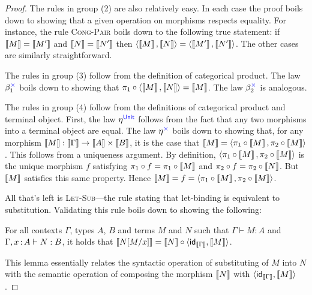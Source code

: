 \begin{proof}
  The rules in group (2) are also relatively easy.
  In each case the proof boils down to showing that
  a given operation on morphisms respects equality.
  For instance, the rule \textsc{Cong-Pair}
  boils down to the following true statement:
  if \(\left\llbracket M\right\rrbracket = \left\llbracket M'\right\rrbracket\)
  and \(\left\llbracket N\right\rrbracket = \left\llbracket N'\right\rrbracket\)
  then \(\langle \left\llbracket M\right\rrbracket,\left\llbracket N\right\rrbracket\rangle = \langle \left\llbracket M'\right\rrbracket,\left\llbracket N'\right\rrbracket\rangle\).
  The other cases are similarly straightforward.

  The rules in group (3) follow from the definition of categorical product.
  The law \(\beta^{\mathbin{{\color{blue}\times}}}_1\) boils down to showing that
  \(\pi_1 \circ \langle \left\llbracket M\right\rrbracket,\left\llbracket N\right\rrbracket\rangle = \left\llbracket M\right\rrbracket\).
  The law \(\beta^{\mathbin{{\color{blue}\times}}}_2\) is analogous.

  The rules in group (4) follow from the definitions of categorical product
  and terminal object. First, the law \(\eta^{\mathsf{{\color{blue}Unit}}}\)
  follows from the fact that any two morphisms into a terminal object are equal.
  The law \(\eta^{\mathbin{{\color{blue}\times}}}\) boils down to showing
  that, for any morphism \(\left\llbracket M\right\rrbracket : \left\llbracket \Gamma\right\rrbracket \to \left\llbracket A\right\rrbracket \times \left\llbracket B\right\rrbracket\),
  it is the case that \(\left\llbracket M\right\rrbracket = \langle \pi_1\circ \left\llbracket M\right\rrbracket, \pi_2\circ\left\llbracket M\right\rrbracket\rangle\).
  This follows from a uniqueness argument.
  By definition, \(\langle \pi_1\circ \left\llbracket M\right\rrbracket, \pi_2\circ\left\llbracket M\right\rrbracket\rangle\)
  is the unique morphism \(f\) satisfying \(\pi_1\circ f = \pi_1 \circ \left\llbracket M\right\rrbracket\)
  and \(\pi_2\circ f = \pi_2 \circ \left\llbracket N\right\rrbracket\). But \(\left\llbracket M\right\rrbracket\)
  satisfies this same property. Hence \(\left\llbracket M\right\rrbracket = f = \langle \pi_1\circ\left\llbracket M\right\rrbracket, \pi_2\circ\left\llbracket M\right\rrbracket\rangle\).

  All that's left is \textsc{Let-Sub}---the rule stating that let-binding is equivalent to substitution.
  Validating this rule boils down to showing the following:
  \begin{lemma} \label{lem:let-is-subst}
    For all contexts \(\Gamma\), types \(A\), \(B\)
    and terms \(M\) and \(N\)
    such that \(\Gamma \vdash M : A\)
    and \(\Gamma,x\,{:}\, A \vdash N : B\),
    it holds that
    \(\left\llbracket N[M/x]\right\rrbracket = \left\llbracket N\right\rrbracket \circ \langle \mathsf{id}_{\left\llbracket \Gamma\right\rrbracket},\left\llbracket M\right\rrbracket\rangle\).
  \end{lemma}
  This lemma essentially relates
  the syntactic operation of substituting
  of \(M\) into \(N\)
  with the semantic operation
  of composing the morphism \(\left\llbracket N\right\rrbracket\) with \(\langle \mathsf{id}_{\left\llbracket \Gamma\right\rrbracket},\left\llbracket M\right\rrbracket\rangle\).


\end{proof}

